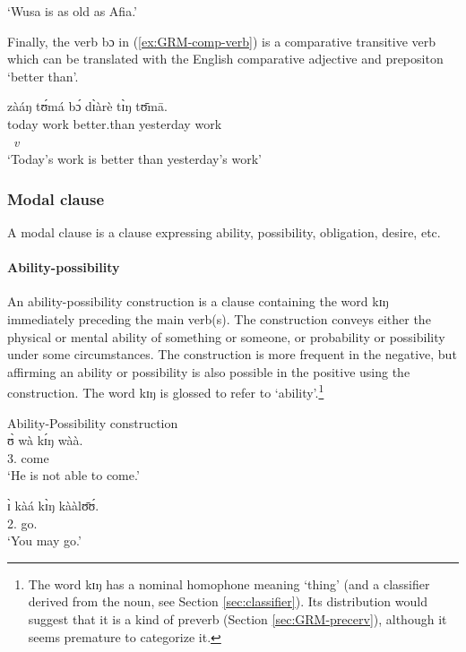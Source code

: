 \glt `Wusa is as old as Afia.'
\z


Finally,  the verb {\sls bɔ} in (\ref{ex:GRM-comp-verb}) is a comparative
transitive verb which can be translated with the English comparative adjective
and prepositon `better than'.


\ea\label{ex:GRM-comp-verb}
\glll zàáŋ tʊ́má bɔ́ dɪ̀àrè tɪ̀ŋ tʊ̄mā.\\
today work better.than yesterday {\art} work\\
{}  {}  {\it v} {} {}   {}\\
\glt `Today's work is better than yesterday's work'
\z


\subsubsection{Modal clause}
\label{sec:GRM-compar-ct}

A modal clause is a clause expressing  ability, possibility,   obligation, desire, 
etc. 


\paragraph{Ability-possibility}
\label{sec:GRM-ability-possibility}

An
ability-possibility construction is a clause containing the word {\sls kɪŋ} 
immediately preceding the main verb(s).  The construction conveys either
the
physical or mental
ability of something or someone, or probability or possibility under some
circumstances. The construction is more frequent in the negative, but affirming
an ability or possibility is also possible in the positive using the
construction. The word {\sls kɪŋ} is glossed  {\abl} to refer to
`ability'.\footnote{The word {\sls kɪŋ} has a  nominal homophone meaning 
`thing' (and a classifier derived from the noun, see Section
\ref{sec:classifier}).  Its distribution would suggest that it is a kind of 
preverb (Section \ref{sec:GRM-precerv}), although it seems premature to
categorize it.}

\ea
\label{ex:}
{\upshape Ability-Possibility construction}\\

\ea
\label{ex:GRM-modal-12.2}
\gll ʊ̀ wà kɪ́ŋ wàà.\\
{3.\sg} {\neg} {\abl} come\\
\glt  `He is not able to come.'

\ex  
\gll ɪ̀ kàá kɪ̀ŋ kààlʊ̄ʊ́.\\
 {2.\sg} {\fut} {\abl} go.{\foc}\\
\glt  `You may go.'

